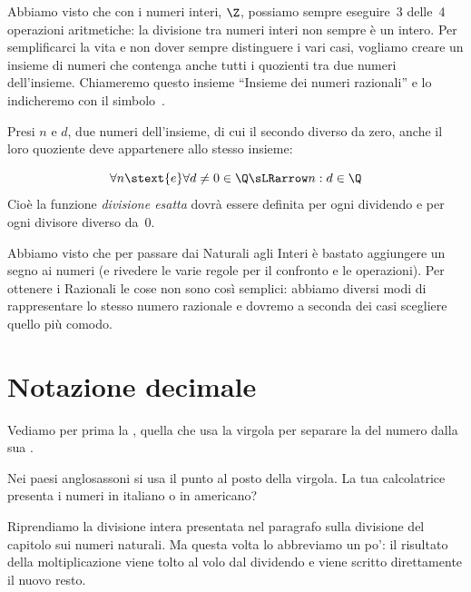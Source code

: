 Abbiamo visto che con i numeri interi, \(\Z\), possiamo sempre eseguire~3 
delle~4 operazioni aritmetiche: la divisione tra numeri interi non sempre è 
un intero. Per semplificarci la vita e non dover sempre distinguere i vari 
casi, vogliamo creare un insieme di numeri che contenga anche tutti i 
quozienti tra due numeri dell'insieme. 
Chiameremo questo insieme ``Insieme dei numeri razionali'' e lo 
indicheremo con il simbolo~\indt{\(\Q\)}.

Presi \(n\) e \(d\), due numeri dell'insieme, di cui il secondo diverso da 
zero, anche il loro quoziente deve appartenere allo stesso insieme:

\vspace{-1em}
\[\forall n \stext{e} \forall d \neq 0 \in \Q \sLRarrow n : d \in \Q\]
Cioè la funzione \emph{divisione esatta} dovrà essere definita per ogni 
dividendo e per ogni divisore diverso da~0.

Abbiamo visto che per passare dai Naturali agli Interi è bastato aggiungere 
un segno ai numeri (e rivedere le varie regole per il confronto e le 
operazioni).
Per ottenere i Razionali le cose non sono così semplici: abbiamo 
diversi modi di rappresentare lo stesso numero 
razionale e dovremo a seconda dei casi scegliere quello più comodo.

\section{Notazione decimale}
\label{sec:razionali_notazione_decimale}

Vediamo per prima la , quella che 
usa la virgola per separare la  del numero dalla sua 
.

\begin{osservazione}{}{}
Nei paesi anglosassoni si usa il punto al posto della virgola. La tua 
calcolatrice presenta i numeri in italiano o in americano?
\end{osservazione}

Riprendiamo la divisione intera presentata nel paragrafo sulla divisione 
del capitolo sui numeri naturali.
Ma questa volta lo abbreviamo un po': il risultato della moltiplicazione 
viene tolto al volo dal dividendo e viene scritto direttamente il nuovo 
resto. 

\vspace{.5em}

